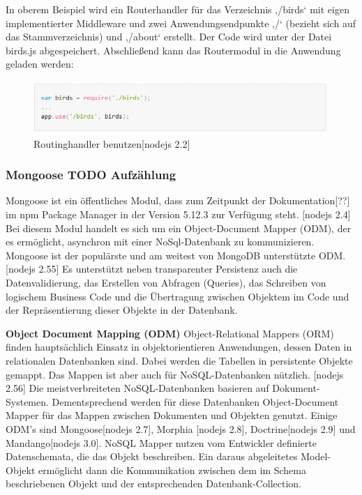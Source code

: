 In oberem Beispiel wird ein Routerhandler für das Verzeichnis ‚/birds‘ mit eigen implementierter Middleware und zwei Anwendungsendpunkte ‚/‘ (bezieht sich auf das Stammverzeichnis) und ‚/about‘ erstellt. Der Code wird unter der Datei birds.js abgespeichert. 
Abschließend kann das Routermodul in die Anwendung geladen werden: 
\newline

\begin{figure}[h]
\centering
\includegraphics[width=14cm]{images/nodejs_expressRouterbenutzen.PNG}
\caption{Routinghandler benutzen[nodejs 2.2]}
\end{figure}

\newpage
\subsubsection{Mongoose TODO Aufzählung}
Mongoose ist ein öffentliches Modul, dass zum Zeitpunkt der Dokumentation[??] im npm Package Manager in der Version 5.12.3 zur Verfügung steht. [nodejs 2.4] Bei diesem Modul handelt es sich um ein Object-Document Mapper (ODM), der es ermöglicht, asynchron mit einer NoSql-Datenbank zu kommunizieren. Mongoose ist der populärste und am weitest von MongoDB unterstützte ODM. [nodejs 2.55] Es unterstützt neben transparenter Persistenz auch die Datenvalidierung, das Erstellen von Abfragen (Queries), das Schreiben von logischem Business Code und die Übertragung zwischen Objektem im Code und der Repräsentierung dieser Objekte in der Datenbank.
\newline

\textbf{Object Document Mapping (ODM)}
\newline
Object-Relational Mappers (ORM) finden hauptsächlich Einsatz in objektorientieren Anwendungen, dessen Daten in relationalen Datenbanken sind. Dabei werden die Tabellen in persistente Objekte gemappt.
Das Mappen ist aber auch für NoSQL-Datenbanken nützlich. [nodejs 2.56] Die meistverbreiteten NoSQL-Datenbanken basieren auf Dokument-Systemen. Dementsprechend werden für diese Datenbanken Object-Document Mapper für das Mappen zwischen Dokumenten und Objekten genutzt. Einige ODM’s sind Mongoose[nodejs 2.7], Morphia [nodejs 2.8], Doctrine[nodejs 2.9] und Mandango[nodejs 3.0].
NoSQL Mapper nutzen vom Entwickler definierte Datenschemata, die das Objekt beschreiben. Ein daraus abgeleitetes Model-Objekt ermöglicht dann die Kommunikation zwischen dem im Schema beschriebenen Objekt und der entsprechenden Datenbank-Collection.
\newline

